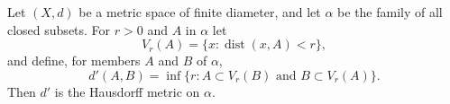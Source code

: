 Let $(X, d)$ be a metric space of finite diameter, and let $\alpha$ be the family of all closed subsets. For $r > 0$ and $A$ in $\alpha$ let
$$V_r(A) = \{ x : \operatorname{dist}(x, A) < r \},$$
and define, for members $A$ and $B$ of $\alpha$,
$$d'(A, B) = \inf \{ r : A \subset V_r(B) \text{ and } B \subset V_r(A) \}.$$
Then $d'$ is the Hausdorff metric on $\alpha$.
